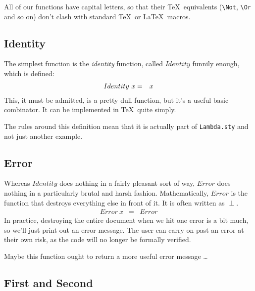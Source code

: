 All of our functions have capital letters, so that their \TeX\ equivalents
(\verb|\Not|, \verb|\Or| and so on) don't clash with standard \TeX\ or
\LaTeX\ macros.

\subsection{Identity}

The simplest function is the {\em identity\/} function, called
$Identity$ funnily enough, which is defined:
\begin{eqnarray*}
   Identity~x  &  =  &  \Identity{x}
\end{eqnarray*}
This, it must be admitted, is a pretty dull function, but
it's a useful basic combinator.  It can be implemented
in \TeX\ quite simply.
\begin{TeXcode}
\def\Identity#1{#1}
\end{TeXcode}
The rules around this definition mean that it is actually part of
\verb|Lambda.sty| and not just another example.

\subsection{Error}

Whereas $Identity$ does nothing in a fairly pleasant sort of way,
$Error$ does nothing in a particularly brutal and harsh fashion.
Mathematically, $Error$ is the function that destroys everything
else in front of it.  It is often written as $\perp$.
\begin{eqnarray*}
   Error~x  &  =  &  Error
\end{eqnarray*}
In practice, destroying the entire document when we hit one error
is a bit much, so we'll just print out an error message.
The user can carry on past an error at their own risk, as the code
will no longer be formally verified.
Maybe this function ought to return a more useful error message \ldots

\subsection{First and Second}


